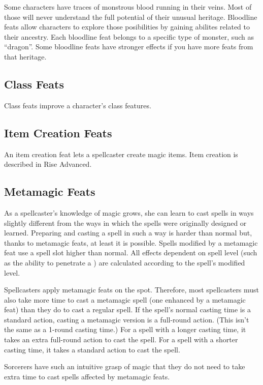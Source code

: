 Some characters have traces of monstrous blood running in their veins. Most of those will never understand the full potential of their unusual heritage. Bloodline feats allow characters to explore those posibilities by gaining abilites related to their ancestry. Each bloodline feat belongs to a specific type of monster, such as ``dragon''. Some bloodline feats have stronger effects if you have more feats from that heritage.

\subsection{Class Feats}
Class feats improve a character's class features.

\subsection{Item Creation Feats}
An item creation feat lets a spellcaster create magic items. Item creation is described in Rise Advanced.

\subsection{Metamagic Feats}
As a spellcaster's knowledge of magic grows, she can learn to cast spells in ways slightly different from the ways in which the spells were originally designed or learned. Preparing and casting a spell in such a way is harder than normal but, thanks to metamagic feats, at least it is possible. Spells modified by a metamagic feat use a spell slot higher than normal. All effects dependent on spell level (such as the ability to penetrate a ) are calculated according to the spell's modified level.

 Spellcasters apply metamagic feats on the spot. Therefore, most spellcasters must also take more time to cast a metamagic spell (one enhanced by a metamagic feat) than they do to cast a regular spell. If the spell's normal casting time is a standard action, casting a metamagic version is a full-round action. (This isn't the same as a 1-round casting time.) For a spell with a longer casting time, it takes an extra full-round action to cast the spell. For a spell with a shorter casting time, it takes a standard action to cast the spell.

\par Sorcerers have such an intuitive grasp of magic that they do not need to take extra time to cast spells affected by metamagic feats.

